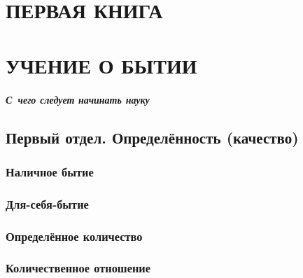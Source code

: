 \documentclass[a5paper, 11pt, twoside, onecolumn, openany]{memoir}
\begin{document}

\part[\hspace{38mm}УЧЕНИЕ О БЫТИИ]%
     {\ \\\vspace{200pt}\Large\mdseries ПЕРВАЯ КНИГА\\\ \\
      \LARGE\bfseries УЧЕНИЕ О БЫТИИ}
\addtocspace{2mm}

\thispagestyle{empty}
\cleardoublepage
{}
\subsubsection{С~чего следует начинать науку}
\pagestyle{plain}


\chapter{Первый отдел. Определённость (качество)}



\section{Наличное бытие}


\section{Для-себя-бытие}





\section{Определённое количество}


\section{Количественное отношение}

\end{document}
